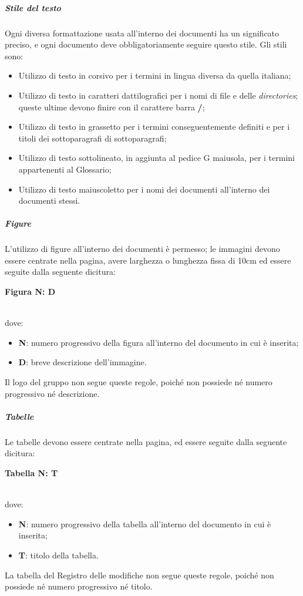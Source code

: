 \documentclass[../norme-di-progetto.tex]{subfiles}
\begin{document}
\subparagraph{Stile del testo}
Ogni diversa formattazione usata all'interno dei documenti ha un significato preciso, e ogni documento deve obbligatoriamente seguire questo stile. Gli stili sono:
\begin{itemize}
  \item Utilizzo di testo in corsivo per i termini in lingua diversa da quella italiana;
  \item Utilizzo di testo in caratteri dattilografici per i nomi di file e delle \textit{directories}; queste ultime devono finire con il carattere barra \textbf{/};
  \item Utilizzo di testo in grassetto per i termini conseguentemente definiti e per i titoli dei sottoparagrafi di sottoparagrafi;
  \item Utilizzo di testo sottolineato, in aggiunta al pedice G maiusola, per i termini appartenenti al Glossario;
  \item Utilizzo di testo maiuscoletto per i nomi dei documenti all'interno dei documenti stessi.
\end{itemize}

\subparagraph{Figure}
L'utilizzo di figure all'interno dei documenti è permesso; le immagini devono essere centrate nella pagina, avere larghezza o lunghezza fissa di 10cm ed essere seguite dalla seguente dicitura: \\ \centerline{\textbf{Figura N: D}} \\ dove:
\begin{itemize}
  \item \textbf{N}: numero progressivo della figura all'interno del documento in cui è inserita;
  \item \textbf{D}: breve descrizione dell'immagine.
\end{itemize}
Il logo del gruppo non segue queste regole, poiché non possiede né numero progressivo né descrizione.

\subparagraph{Tabelle}
Le tabelle devono essere centrate nella pagina, ed essere seguite dalla seguente dicitura: \\ \centerline{\textbf{Tabella N: T}} \\ dove:
\begin{itemize}
  \item \textbf{N}: numero progressivo della tabella all'interno del documento in cui è inserita;
  \item \textbf{T}: titolo della tabella.
\end{itemize}
La tabella del Registro delle modifiche non segue queste regole, poiché non possiede né numero progressivo né titolo.
\end{document}
